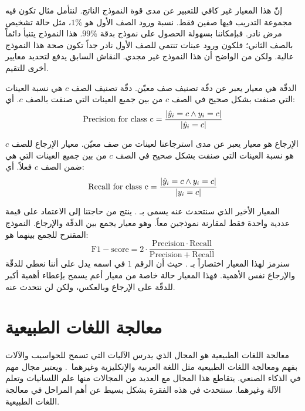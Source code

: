 إنّ هذا المعيار غير كافي للتعبير عن مدى قوة النموذج الناتج.
لنتأمل مثال تكون فيه مجموعة التدريب فيها صفين فقط.
نسبة ورود الصف الأول هو $1\%$،
مثل حالة تشخيص مرض نادر.
فبإمكاننا بسهولة الحصول على نموذج بدقة $99\%$.
هذا النموذج يتنبأ دائماً بالصف الثاني؛
فلكون ورود عينات تنتمي للصف الأول نادر جداً تكون صحة هذا النموذج عالية.
ولكن من الواضح أن هذا النموذج غير مجدي.
النقاش السابق يدفع لتحديد معايير أخرى للتقيم.

الدقّة  هي معيار يعبر عن دقّة تصنيف صف معيّن.
دقّة تصنيف الصف $c$ هي نسبة العينات التي صنفت بشكل صحيح في الصف $c$ من بين جميع العينات التي صنفت بالصف $c$.
أي:
$$ \mathrm{Precision\ for\ class\ c} = \frac{ \left\vert \hat{y}_i = c \wedge y_i = c \right\vert }
{ \left\vert \hat{y}_i = c \right\vert } $$

الإرجاع  هو معيار يعبر عن مدى استرجاعنا لعينات من صف معيّن.
معيار الإرجاع للصف $c$ هو نسبة العينات التي صنفت بشكل صحيح في الصف $c$ من بين جميع العينات التي هي ضمن الصف $c$ فعلاً.
أي:
$$ \mathrm{Recall\ for\ class\ c} =
\frac{ \left\vert \hat{y}_i = c \wedge y_i = c \right\vert }{ \left\vert y_i = c \right\vert } $$

المعيار الأخير الذي سنتحدث عنه يسمى بـ .
ينتج من حاجتنا إلى الاعتماد على قيمة عددية واحدة فقط لمقارنة نموذجين معاً.
وهو معيار يجمع بين الدقّة والإرجاع.
النموذج المقترح للجمع بينهما هو:
$$ \mathrm{F1-score} = 2 \cdot \frac{ \mathrm{Precision} \cdot \mathrm{Recall}}
{\mathrm{Precision} + \mathrm{Recall}} $$
سنرمز لهذا المعيار اختصاراً بـ .
حيث أن الرقم $1$ في اسمه يدل على أننا نعطي للدقّة والإرجاع نفس الأهمية.
فهذا المعيار حالة خاصة من معيار أعم يسمح بإعطاء أهمية أكبر للدقّة على الإرجاع وبالعكس، ولكن لن نتحدث عنه.



\section{معالجة اللغات الطبيعية}
معالجة اللغات الطبيعية
هو المجال الذي يدرس الآليات التي تسمح للحواسيب والآلات بفهم ومعالجة اللغات الطبيعية مثل اللغة العربية والإنكليزية وغيرهما~\cite{riad2017}.
ويعتبر مجال مهم في الذكاء الصنعي.
يتقاطع هذا المجال مع العديد من المجالات منها علم اللسانيات وتعلم الآلة وغيرهما.
سنتحدث في هذه الفقرة بشكل بسيط عن أهم المراحل في معالجة اللغات الطبيعية.

